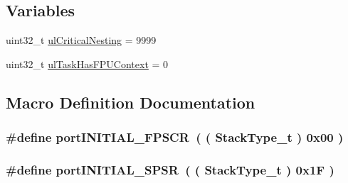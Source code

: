 \subsection*{Variables}
\begin{DoxyCompactItemize}
\item 
uint32\-\_\-t \hyperlink{CCS_2ARM__Cortex-R4_2port_8c_abd5c4f2fdb773b389a89cf1bb14f22c8}{ul\-Critical\-Nesting} = 9999
\item 
uint32\-\_\-t \hyperlink{CCS_2ARM__Cortex-R4_2port_8c_adb618e609f6505a99aa1d2bf85f70e51}{ul\-Task\-Has\-F\-P\-U\-Context} = 0
\end{DoxyCompactItemize}


\subsection{Macro Definition Documentation}
\hypertarget{CCS_2ARM__Cortex-R4_2port_8c_ac0d88abb68188f5d7da45c60a5f78c02}{
\subsubsection[{port\-I\-N\-I\-T\-I\-A\-L\-\_\-\-F\-P\-S\-C\-R}]{\setlength{\rightskip}{0pt plus 5cm}\#define port\-I\-N\-I\-T\-I\-A\-L\-\_\-\-F\-P\-S\-C\-R~( ( {\bf Stack\-Type\-\_\-t} ) 0x00 )}}\label{CCS_2ARM__Cortex-R4_2port_8c_ac0d88abb68188f5d7da45c60a5f78c02}
\hypertarget{CCS_2ARM__Cortex-R4_2port_8c_a153b1b0b2476d5fea865a32e6d27027d}{
\subsubsection[{port\-I\-N\-I\-T\-I\-A\-L\-\_\-\-S\-P\-S\-R}]{\setlength{\rightskip}{0pt plus 5cm}\#define port\-I\-N\-I\-T\-I\-A\-L\-\_\-\-S\-P\-S\-R~( ( {\bf Stack\-Type\-\_\-t} ) 0x1\-F )}}\label{CCS_2ARM__Cortex-R4_2port_8c_a153b1b0b2476d5fea865a32e6d27027d}
